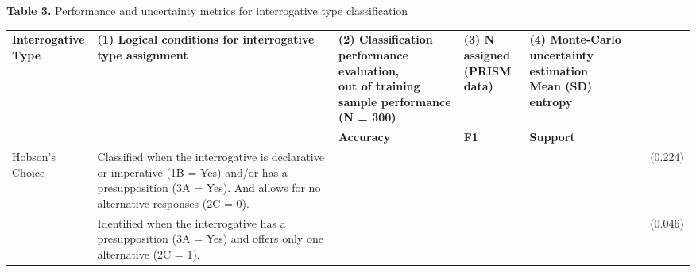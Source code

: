 \documentclass{article}
\newlength{\tabletotalwidth}
\begin{document}
\hspace*{0.5cm}\textbf{Table 3.} Performance and uncertainty metrics for interrogative type classification

\vspace{0.5em}

\noindent\begin{minipage}{\tabletotalwidth}
\fontsize{10}{12}\selectfont

\renewcommand{\arraystretch}{1.4} %
\begin{tabular}{%
  p{2cm} p{6cm}
  >{\centering\arraybackslash}p{1cm}
  >{\centering\arraybackslash}p{1cm}
  >{\centering\arraybackslash}p{1cm}
  >{\centering\arraybackslash}p{1.5cm}
  >{\centering\arraybackslash}p{2.0cm}}
\toprule
\parbox[t]{2cm}{\centering\textbf{Interrogative}\\\textbf{Type}} &
\parbox[t]{6cm}{\centering\textbf{(1) Logical conditions for interrogative type assignment}} &
%
{\parbox[t]{\dimexpr 1cm + 1cm + 1cm + 4\tabcolsep\relax}{\centering\textbf{(2) Classification performance evaluation,}\\\textbf{out of training sample performance (N = 300)}}} &
\parbox[t]{1.5cm}{\centering\textbf{(3) N assigned}\\\textbf{(PRISM data)}} &
\parbox[t]{2.0cm}{\centering\textbf{(4) Monte-Carlo uncertainty estimation}\\\textbf{Mean (SD) entropy}} \\
\cmidrule(lr){3-5}
 &  & \textbf{Accuracy} & \textbf{F1} & \textbf{Support} &  &  \\
\midrule
\parbox[t]{2.00cm}{Hobson’s Choice} & \parbox[t]{6.00cm}{Classified when the interrogative is declarative or imperative (1B = Yes) and/or has a presupposition (3A = Yes). And allows for no alternative responses (2C = 0).} & \parbox[t]{1.00cm}{} & \parbox[t]{1.00cm}{} & \parbox[t]{1.00cm}{} & \parbox[t]{1.50cm}{} & \parbox[t]{2.00cm}{ (0.224)} \\
\addlinespace[1.0em]
\parbox[t]{2.00cm}{Why} & \parbox[t]{6.00cm}{Identified when the interrogative has a presupposition (3A = Yes) and offers only one alternative (2C = 1).} & \parbox[t]{1.00cm}{} & \parbox[t]{1.00cm}{} & \parbox[t]{1.00cm}{} & \parbox[t]{1.50cm}{} & \parbox[t]{2.00cm}{ (0.046)} \\

\end{tabular}
\end{minipage}
\end{document}
